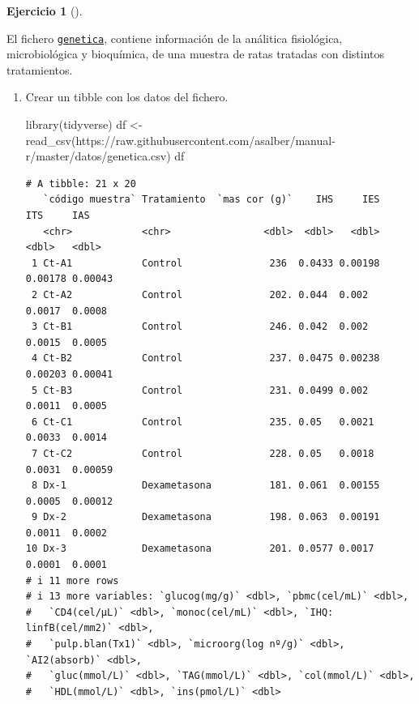 \documentclass[
  a4paper,
]{scrreport}
\newenvironment{Shaded}{\begin{snugshade}}{\end{snugshade}}
\newcommand{\FunctionTok}[1]{\textcolor[rgb]{0.28,0.35,0.67}{#1}}
\newcommand{\NormalTok}[1]{\textcolor[rgb]{0.00,0.23,0.31}{#1}}
\newcommand{\OtherTok}[1]{\textcolor[rgb]{0.00,0.23,0.31}{#1}}
\newcommand{\StringTok}[1]{\textcolor[rgb]{0.13,0.47,0.30}{#1}}
\theoremstyle{definition}
\newtheorem{exercise}{Ejercicio}[chapter]
\theoremstyle{definition}
\theoremstyle{remark}
\begin{document}
\begin{exercise}[]\protect\hypertarget{exr-preprocesamiento-1}{}\label{exr-preprocesamiento-1}

El fichero
\href{https://raw.githubusercontent.com/asalber/manual-r/master/datos/genetica.csv}{\texttt{genetica}},
contiene información de la análitica fisiológica, microbiológica y
bioquímica, de una muestra de ratas tratadas con distintos tratamientos.

\begin{enumerate}
\def\labelenumi{\alph{enumi}.}
\item
  Crear un tibble con los datos del fichero.

  \begin{tcolorbox}[enhanced jigsaw, title=\textcolor{quarto-callout-note-color}{\faInfo}\hspace{0.5em}{Solución}, titlerule=0mm, toprule=.15mm, colbacktitle=quarto-callout-note-color!10!white, arc=.35mm, colframe=quarto-callout-note-color-frame, opacitybacktitle=0.6, coltitle=black, left=2mm, colback=white, opacityback=0, breakable, bottomrule=.15mm, toptitle=1mm, leftrule=.75mm, bottomtitle=1mm, rightrule=.15mm]

\begin{Shaded}
\begin{Highlighting}[]
\FunctionTok{library}\NormalTok{(tidyverse)}
\NormalTok{df }\OtherTok{\textless{}{-}} \FunctionTok{read\_csv}\NormalTok{(}\StringTok{\textquotesingle{}https://raw.githubusercontent.com/asalber/manual{-}r/master/datos/genetica.csv\textquotesingle{}}\NormalTok{)}
\NormalTok{df}
\end{Highlighting}
\end{Shaded}

\begin{verbatim}
# A tibble: 21 x 20
   `código muestra` Tratamiento  `mas cor (g)`    IHS     IES     ITS     IAS
   <chr>            <chr>                <dbl>  <dbl>   <dbl>   <dbl>   <dbl>
 1 Ct-A1            Control               236  0.0433 0.00198 0.00178 0.00043
 2 Ct-A2            Control               202. 0.044  0.002   0.0017  0.0008 
 3 Ct-B1            Control               246. 0.042  0.002   0.0015  0.0005 
 4 Ct-B2            Control               237. 0.0475 0.00238 0.00203 0.00041
 5 Ct-B3            Control               231. 0.0499 0.002   0.0011  0.0005 
 6 Ct-C1            Control               235. 0.05   0.0021  0.0033  0.0014 
 7 Ct-C2            Control               228. 0.05   0.0018  0.0031  0.00059
 8 Dx-1             Dexametasona          181. 0.061  0.00155 0.0005  0.00012
 9 Dx-2             Dexametasona          198. 0.063  0.00191 0.0011  0.0002 
10 Dx-3             Dexametasona          201. 0.0577 0.0017  0.0001  0.0001 
# i 11 more rows
# i 13 more variables: `glucog(mg/g)` <dbl>, `pbmc(cel/mL)` <dbl>,
#   `CD4(cel/µL)` <dbl>, `monoc(cel/mL)` <dbl>, `IHQ: linfB(cel/mm2)` <dbl>,
#   `pulp.blan(Tx1)` <dbl>, `microorg(log nº/g)` <dbl>, `AI2(absorb)` <dbl>,
#   `gluc(mmol/L)` <dbl>, `TAG(mmol/L)` <dbl>, `col(mmol/L)` <dbl>,
#   `HDL(mmol/L)` <dbl>, `ins(pmol/L)` <dbl>
\end{verbatim}


\end{tcolorbox}
\end{enumerate}
\end{exercise}
\end{document}
